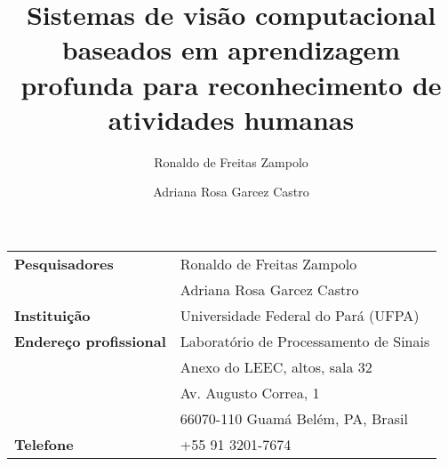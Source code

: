 

\title{Sistemas de visão computacional baseados em aprendizagem profunda para reconhecimento de atividades humanas}

\author[1]{Ronaldo de Freitas Zampolo}
\author[2]{Adriana Rosa Garcez Castro}



\maketitle

\begin{table}[!th]
\begin{tabular}{|l p{}|}
\hline
\textbf{Pesquisadores}        & Ronaldo de Freitas Zampolo \\
			      & Adriana Rosa Garcez Castro\\
\textbf{Instituição}          & Universidade Federal do Pará (UFPA)\\
\textbf{Endereço profissional}& Laboratório de Processamento de Sinais\\
                              & Anexo do LEEC, altos, sala 32\\
                              & Av. Augusto Correa, 1\\
                              & 66070-110 Guamá Belém, PA, Brasil\\
\textbf{Telefone}             & +55 91 3201-7674 \\

\end{tabular}
\end{table}
